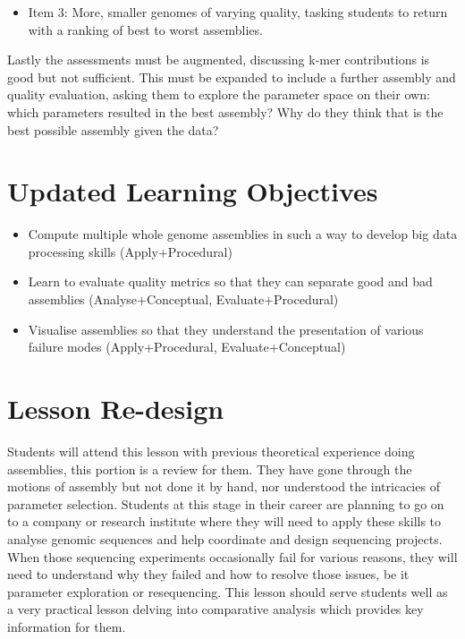 \documentclass[paper=a4,justified,a4paper]{tufte-handout}
\providecommand{\tightlist}{%
  \setlength{\itemsep}{0pt}\setlength{\parskip}{0pt}}
\begin{document}
\begin{itemize}
\tightlist
\item
  Item 3: More, smaller genomes of varying quality, tasking students to
  return with a ranking of best to worst assemblies.
\end{itemize}

Lastly the assessments must be augmented, discussing k-mer contributions
is good but not sufficient. This must be expanded to include a further
assembly and quality evaluation, asking them to explore the parameter
space on their own: which parameters resulted in the best assembly? Why
do they think that is the best possible assembly given the data?

\hypertarget{updated-learning-objectives}{%
\section{Updated Learning
Objectives}\label{updated-learning-objectives}}

\begin{itemize}
\tightlist
\item
  \color{green}Compute \color{blue}multiple whole genome assemblies
  \color{black} in such a way to \color{red}develop big data processing
  skills \color{black} (Apply+Procedural)
\item
  Learn to \color{green}evaluate \color{blue}quality metrics
  \color{black} so that they can \color{red}separate good and bad
  assemblies \color{black} (Analyse+Conceptual, Evaluate+Procedural)
\item
  \color{green}Visualise \color{blue}assemblies \color{black} so that
  they \color{red}understand the presentation of various failure modes
  \color{black} (Apply+Procedural, Evaluate+Conceptual)
\end{itemize}

\hypertarget{lesson-re-design}{%
\section{Lesson Re-design}\label{lesson-re-design}}

Students will attend this lesson with previous theoretical experience
doing assemblies, this portion is a review for them. They have gone
through the motions of assembly but not done it by hand, nor understood
the intricacies of parameter selection. Students at this stage in their
career are planning to go on to a company or research institute where
they will need to apply these skills to analyse genomic sequences and
help coordinate and design sequencing projects. When those sequencing
experiments occasionally fail for various reasons, they will need to
understand why they failed and how to resolve those issues, be it
parameter exploration or resequencing. This lesson should serve students
well as a very practical lesson delving into comparative analysis which
provides key information for them.
\end{document}
